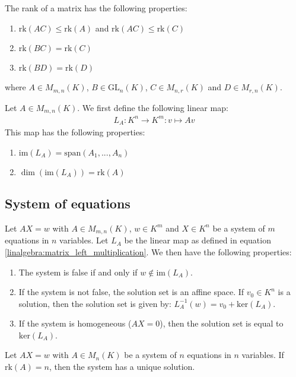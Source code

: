 	\begin{property}\label{linalgebra:rank_properties}
	        The rank of a matrix has the following properties:
        	\begin{enumerate}
			\item $\text{rk}(AC)\leq\text{rk}(A)$ and $\text{rk}(AC)\leq\text{rk}(C)$
        		\item $\text{rk}(BC)=\text{rk}(C)$
		        \item $\text{rk}(BD)=\text{rk}(D)$
		\end{enumerate}
		where $A\in M_{m,n}(K)$, $B\in\text{GL}_n(K)$, $C\in M_{n,r}(K)$ and $D\in M_{r,n}(K)$.
	\end{property}
	\begin{property}\label{linalgebra:dim_matrix_left_multiplication}
	        Let $A\in M_{m,n}(K)$. We first define the following linear map:
        	\begin{gather}
			\label{linalgebra:matrix_left_multiplication}
        		L_A:K^n\rightarrow K^m:v\mapsto Av
		\end{gather}
	        This map has the following properties:
        	\begin{enumerate}
        		\item $\text{im}(L_A) = \text{span}(A_1, ..., A_n)$
			\item $\dim(\text{im}(L_A))=\text{rk}(A)$
		\end{enumerate}
	\end{property}
    
\subsection{System of equations}

	\begin{property}\label{linalgebra:matrix_and_equations}
	        Let $AX=w$ with $A\in M_{m,n}(K)$, $w\in K^m$ and $X\in K^n$ be a system of $m$ equations in $n$ variables. Let $L_A$ be the linear map as defined in equation \ref{linalgebra:matrix_left_multiplication}. We then have the following properties:
        	\begin{enumerate}
			\item The system is false if and only if $w\not\in\text{im}(L_A)$.
        		\item If the system is not false, the solution set is an affine space. If $v_0\in K^n$ is a solution, then the solution set is given by: $L_A^{-1}(w)=v_0+\text{ker}(L_A)$.
		        \item If the system is homogeneous ($AX=0$), then the solution set is equal to $\text{ker}(L_A)$.
		\end{enumerate}
	\end{property}
	\begin{property}[Uniqueness]\label{linalgebra:rank_unique_solution}
	        Let $AX=w$ with $A\in M_n(K)$ be a system of $n$ equations in $n$ variables. If $\text{rk}(A)=n$, then the system has a unique solution.
	\end{property}
	
